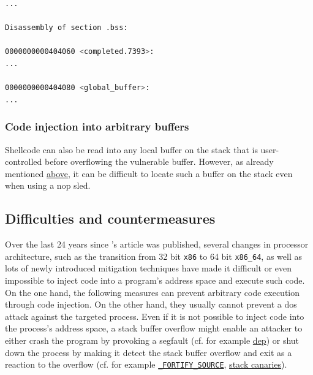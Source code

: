 \begin{lstlisting}[language=bash,float=ht,caption={Disassembly excerpt of the 64 bit binary compiled from the code in \cref{lst:local-global-buffer} with \texttt{gcc -o local-global-buffer local-global-buffer.c -no-pie}, retrieved with \texttt{objdump -D local-global-buffer}}, label={lst:local-global-buffer-disassembly}]
        ...

Disassembly of section .bss:

0000000000404060 <completed.7393>:
...

0000000000404080 <global_buffer>:
...
\end{lstlisting}

\subsubsection{Code injection into arbitrary buffers}
\label{subsubsec:ci-into-arbitrary-buffer}

Shellcode can also be read into any local buffer on the stack that is user-controlled before overflowing the vulnerable buffer.
However, as already mentioned \hyperref[subsubsec:ci-via-globals]{above}, it can be difficult to locate such a buffer on the stack even when using a \acs{nop} sled.

\subsection{Difficulties and countermeasures}
\label{subsec:ci-countermeasures}

Over the last 24 years since \citeauthor{AlephOne1996}'s article  was published, several changes in processor architecture, such as the transition from 32 bit \texttt{x86} to 64 bit \texttt{x86\_64}, as well as lots of newly introduced mitigation techniques have made it difficult or even impossible to inject code into a program's address space and execute such code.
On the one hand, the following measures can prevent arbitrary code execution through code injection.
On the other hand, they usually cannot prevent a \gls{dos} attack against the targeted process.
Even if it is not possible to inject code into the process's address space, a stack buffer overflow might enable an attacker to either crash the program by provoking a \gls{segfault} (cf. for example \hyperref[subsubsec:ci-data-execution-prevention]{\acl{dep}}) or shut down the process by making it detect the stack buffer overflow and exit as a reaction to the overflow (cf. for example \hyperref[subsubsec:ci-fortify-source]{\texttt{\_FORTIFY\_SOURCE}}, \hyperref[subsubsec:ci-stack-canaries]{stack canaries}).

